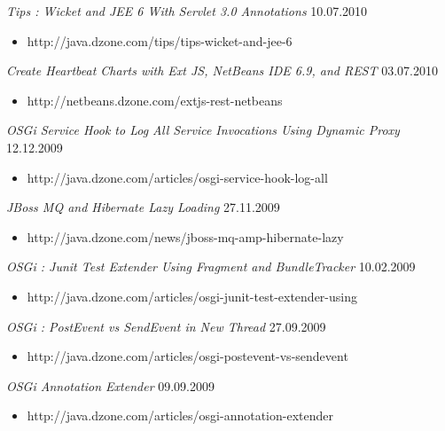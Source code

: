 \documentclass{res}
\begin{document}
\begin{resume}
{\sl Tips : Wicket and JEE 6 With Servlet 3.0 Annotations}  \hfill  10.07.2010	\\
\begin{itemize}
\item[] http://java.dzone.com/tips/tips-wicket-and-jee-6
\end{itemize}

{\sl Create Heartbeat Charts with Ext JS, NetBeans IDE 6.9, and REST}  \hfill    03.07.2010	\\
\begin{itemize}
\item[] http://netbeans.dzone.com/extjs-rest-netbeans
\end{itemize}

{\sl OSGi Service Hook to Log All Service Invocations Using Dynamic Proxy}  \hfill    12.12.2009	\\
\begin{itemize}
\item[] http://java.dzone.com/articles/osgi-service-hook-log-all
\end{itemize}

{\sl JBoss MQ and Hibernate Lazy Loading}  \hfill    27.11.2009	\\
\begin{itemize}
\item[] http://java.dzone.com/news/jboss-mq-amp-hibernate-lazy
\end{itemize}

{\sl OSGi : Junit Test Extender Using Fragment and BundleTracker}  \hfill  10.02.2009	\\
\begin{itemize}
\item[] http://java.dzone.com/articles/osgi-junit-test-extender-using
\end{itemize}

{\sl OSGi : PostEvent vs SendEvent in New Thread}  \hfill   27.09.2009	\\
\begin{itemize}
\item[] http://java.dzone.com/articles/osgi-postevent-vs-sendevent
\end{itemize}

{\sl OSGi Annotation Extender}  \hfill    09.09.2009	\\
\begin{itemize}
\item[] http://java.dzone.com/articles/osgi-annotation-extender
\end{itemize}


\end{resume}
\end{document}
